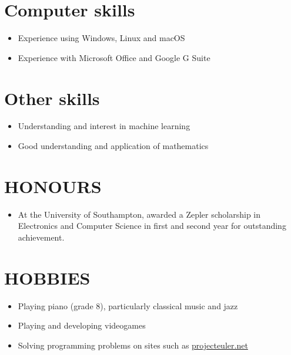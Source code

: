 \documentclass[margin]{res}
\begin{document}
\begin{resume}
\normalsize{\section{Computer skills}}
\begin{itemize}
\item Experience using Windows, Linux and macOS
\item Experience with Microsoft Office and Google G Suite
\end{itemize}

\normalsize{\section{Other skills}}
\begin{itemize}
\item Understanding and interest in machine learning
\item Good understanding and application of mathematics
\end{itemize}

\section{HONOURS}
\begin{itemize}
\item At the University of Southampton, awarded a Zepler scholarship in
Electronics and Computer Science in first and second year for outstanding
achievement.
\end{itemize}

\section{HOBBIES}
\begin{itemize}
\item Playing piano (grade 8), particularly classical music and jazz
\item Playing and developing videogames
\item Solving programming problems on sites such as
\href{https://projecteuler.net/}{projecteuler.net}
\end{itemize}

\end{resume}
\end{document}

